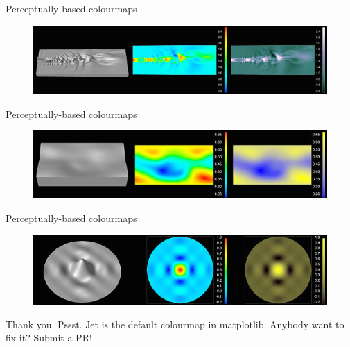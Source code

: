\documentclass[10pt,presentation,compress]{beamer}
\begin{document}
\begin{frame}{Perceptually-based colourmaps}
  \begin{figure}[htp]
    \includegraphics[scale=0.55]{pjetnoise.png}
  \end{figure}
\end{frame}

\begin{frame}{Perceptually-based colourmaps}
  \begin{figure}[htp]
    \includegraphics[scale=0.55]{pmagfield.png}
  \end{figure}
\end{frame}

\begin{frame}{Perceptually-based colourmaps}
  \begin{figure}[htp]
    \includegraphics[scale=0.55]{psinc.png}
  \end{figure}
\end{frame}

\begin{frame}
  \begin{center}
    Thank you.
    \linebreak
    \linebreak
    Pssst.  Jet is the default colourmap in matplotlib.  Anybody want to fix it?  Submit a PR!
  \end{center}
\end{frame}
\end{document}
